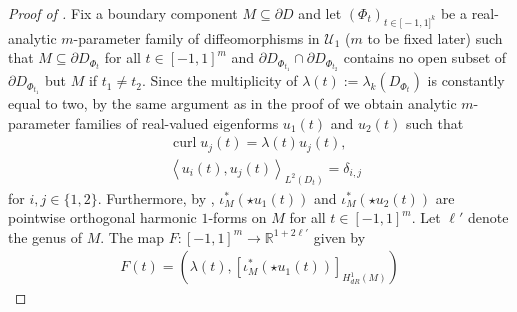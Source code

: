 \documentclass[11pt,reqno]{amsart}
\DeclareMathOperator{\curl}{curl}
\begin{document}
\begin{proof}[Proof of ]
        Fix a boundary component $M \subseteq \partial D$ and let $(\Phi_t)_{t \in \mathbb [-1,1]^{k}}$ be a real-analytic $m$-parameter family of diffeomorphisms in $\mathcal U_1$ ($m$ to be fixed later) such that $M \subseteq \partial D_{\Phi_t}$ for all $t \in [-1,1]^m$ and $\partial D_{\Phi_{t_1}} \cap \partial D_{\Phi_{t_2}}$ contains no open subset of $\partial D_{\Phi_{t_1}}$ but $M$ if $t_1 \neq t_2$. Since the multiplicity of $\lambda(t) := \lambda_k(D_{\Phi_t})$ is constantly equal to two, by the same argument as in the proof of  we obtain analytic $m$-parameter families of real-valued eigenforms $u_1(t)$ and $u_2(t)$ such that
        \begin{align*}
            &\curl u_j(t) = \lambda(t) u_j(t), \\
            &\left\langle u_i(t),u_j (t)\right\rangle_{L^2(D_t)} = \delta_{i,j}
        \end{align*}
        for $i,j \in \{1,2\}$. Furthermore, by , $\iota_M^\ast (\star u_1(t))$ and $\iota_M^\ast (\star u_2(t))$ are pointwise orthogonal harmonic $1$-forms on $M$ for all $t \in [-1,1]^m$. Let $\ell'$ denote the genus of $M$. The map $F:[-1,1]^m \to \mathbb R^{1+2\ell'}$ given by
        \begin{align*}
            F(t) = \left(\lambda(t),[\iota_M^\ast (\star u_1(t))]_{H^1_{dR}(M)}\right)
        \end{align*}

\end{proof}
\end{document}
